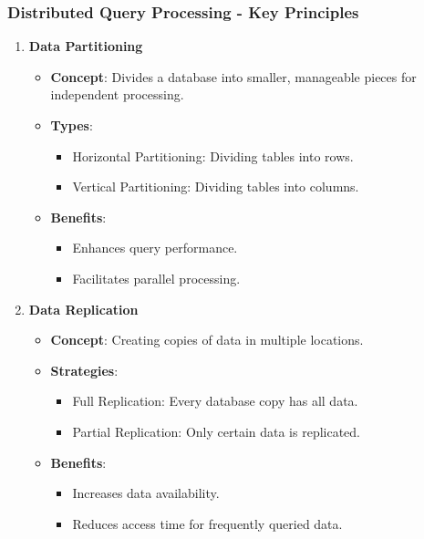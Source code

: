 \documentclass[aspectratio=169]{beamer}
\begin{document}
\begin{frame}[fragile]
    \frametitle{Distributed Query Processing - Key Principles}
    \begin{enumerate}
        \item \textbf{Data Partitioning}
        \begin{itemize}
            \item \textbf{Concept}: Divides a database into smaller, manageable pieces for independent processing.
            \item \textbf{Types}:
            \begin{itemize}
                \item Horizontal Partitioning: Dividing tables into rows.
                \item Vertical Partitioning: Dividing tables into columns.
            \end{itemize}
            \item \textbf{Benefits}:
            \begin{itemize}
                \item Enhances query performance.
                \item Facilitates parallel processing.
            \end{itemize}
        \end{itemize}
        
        \item \textbf{Data Replication}
        \begin{itemize}
            \item \textbf{Concept}: Creating copies of data in multiple locations.
            \item \textbf{Strategies}:
            \begin{itemize}
                \item Full Replication: Every database copy has all data.
                \item Partial Replication: Only certain data is replicated.
            \end{itemize}
            \item \textbf{Benefits}:
            \begin{itemize}
                \item Increases data availability.
                \item Reduces access time for frequently queried data.
            \end{itemize}
        \end{itemize}
    \end{enumerate}
\end{frame}
\end{document}
